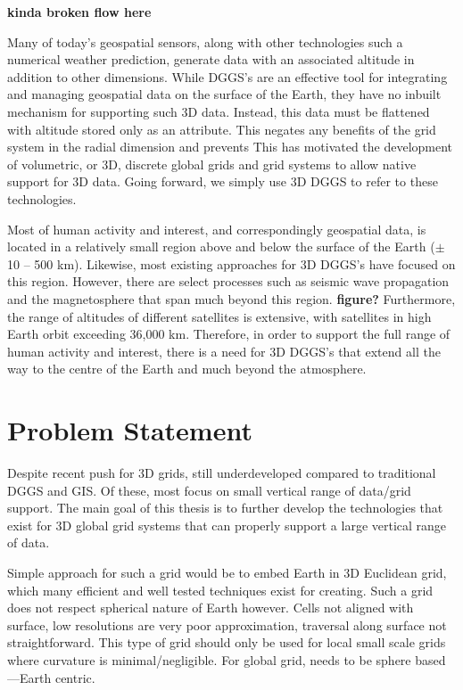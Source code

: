 \textbf{kinda broken flow here}

Many of today's geospatial sensors, along with other technologies such a numerical weather prediction, generate data with an associated altitude in addition to other dimensions.
While DGGS's are an effective tool for integrating and managing geospatial data on the surface of the Earth, they have no inbuilt mechanism for supporting such 3D data.
Instead, this data must be flattened with altitude stored only as an attribute.
This negates any benefits of the grid system in the radial dimension and prevents 
This has motivated the development of volumetric, or 3D, discrete global grids and grid systems to allow native support for 3D data. Going forward, we simply use 3D DGGS to refer to these technologies. 


Most of human activity and interest, and correspondingly geospatial data, is located in a relatively small region above and below the surface of the Earth ($\pm$10 -- 500 km).
Likewise, most existing approaches for 3D DGGS's have focused on this region.
However, there are select processes such as seismic wave propagation and the magnetosphere that span much beyond this region. \textbf{figure?}
Furthermore, the range of altitudes of different satellites is extensive, with satellites in high Earth orbit exceeding 36,000 km.
Therefore, in order to support the full range of human activity and interest, there is a need for 3D DGGS's that extend all the way to the centre of the Earth and much beyond the atmosphere.


\section{Problem Statement}



Despite recent push for 3D grids, still underdeveloped compared to traditional DGGS and GIS. Of these, most focus on small vertical range of data/grid support. The main goal of this thesis is to further develop the technologies that exist for 3D global grid systems that can properly support a large vertical range of data.

Simple approach for such a grid would be to embed Earth in 3D Euclidean grid, which many efficient and well tested techniques exist for creating. Such a grid does not respect spherical nature of Earth however. Cells not aligned with surface, low resolutions are very poor approximation, traversal along surface not straightforward. This type of grid should only be used for local small scale grids where curvature is minimal/negligible. For global grid, needs to be sphere based---Earth centric. 

